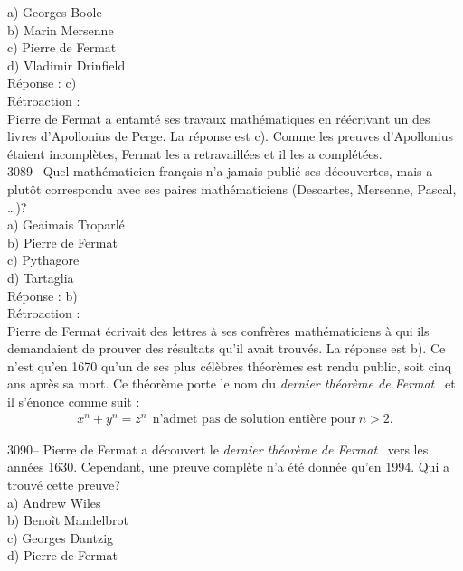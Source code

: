 \documentclass[letterpaper, 12pt]{article}
\begin{document}
a) Georges Boole\\
b) Marin Mersenne\\
c) Pierre de Fermat\\
d) Vladimir Drinfield\\

R\'eponse : c)\\

R\'etroaction :\\
Pierre de Fermat a entamt\'e ses travaux math\'ematiques en r\'e\'ecrivant un des livres d'Apollonius de Perge. La r\'eponse est c). Comme les preuves d'Apollonius \'etaient incompl\`etes, Fermat les a retravaill\'ees et il les a compl\'et\'ees.\\



3089-- Quel math\'ematicien fran\c cais n'a jamais publi\'e ses d\'ecouvertes, mais a plut\^ot correspondu avec ses paires math\'ematiciens (Descartes, Mersenne, Pascal, \dots)?\\

a) Geaimais Troparl\'e\\
b) Pierre de Fermat\\
c) Pythagore\\
d) Tartaglia\\

R\'eponse : b)\\

R\'etroaction :\\
Pierre de Fermat \'ecrivait des lettres \`a ses confr\`eres math\'ematiciens \`a qui ils demandaient de prouver des r\'esultats qu'il avait trouv\'es. La r\'eponse est b). Ce n'est qu'en 1670 qu'un de ses plus c\'el\`ebres th\'eor\`emes est rendu public, soit cinq ans apr\`es sa mort. Ce th\'eor\`eme porte le nom du \og \emph{dernier th\'eor\`eme de Fermat} \fg \ et il s'\'enonce comme suit :
\begin{eqnarray*}
x^{n} + y^{n} = z^{n} \ \ \textrm{n'admet pas de solution enti\`ere pour} \ n > 2.
\end{eqnarray*}



3090-- Pierre de Fermat a d\'ecouvert le \og \emph{dernier th\'eor\`eme de Fermat} \fg \ vers les ann\'ees 1630. Cependant, une preuve compl\`ete n'a \'et\'e donn\'ee qu'en 1994. Qui a trouv\'e cette preuve?\\

a) Andrew Wiles\\
b) Beno\^it Mandelbrot\\
c) Georges Dantzig\\
d) Pierre de Fermat\\
\end{document}
